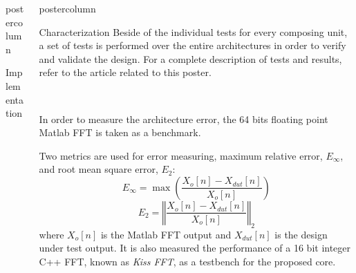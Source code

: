 \documentclass[final]{beamer}
\begin{document}
\begin{frame}{}
\begin{columns}
\begin{column}{.5\textwidth}
\begin{beamercolorbox}[center,wd=0.9\textwidth]{postercolumn}
\begin{minipage}[T]{.99\textwidth}
{\begin{block}{Implementation}
	    \end{block}

      }
      \end{minipage}
   \end{beamercolorbox}
\end{column}




\begin{column}{.5\textwidth}
   \begin{beamercolorbox}[center,wd=\textwidth]{postercolumn}
      \begin{minipage}[T]{.99\textwidth}
      \parbox[t][105cm]{\textwidth}{

		\begin{block}{Characterization}
		\justify
			Beside of the individual tests for every composing unit, a set of tests is performed over the entire architectures in order to verify and validate the design.
			For a complete description of tests and results, refer to the article related to this poster.\\
			~\\
			\begin{column}{.37\textwidth}
				In order to measure the architecture error, the 64 bits floating point Matlab FFT is taken as a benchmark.

				Two metrics are used for error measuring, maximum relative error, $E_\infty$, and root mean square error, $E_2$:
				\begin{equation}
				E_\infty = \max\left(\frac{ X_o[n] - X_{dut}[n]}{X_o[n]}\right)
				\label{eq:norma1}
				\end{equation}
				\begin{equation}
				E_2 = \left\Vert\frac{X_o[n] - X_{dut}[n]}{X_o[n]}\right\Vert_2
				\label{eq:norma2}
				\end{equation}
				where $X_o[n]$ is the Matlab FFT output and $X_{dut}[n]$ is the design under test output.
				It is also measured the performance of a 16 bit integer C++ FFT, known as \emph{Kiss FFT}, as a testbench for the proposed core.\\
			~\\
				

\end{column}
\end{block}}
\end{minipage}
\end{beamercolorbox}
\end{column}
\end{columns}
\end{frame}
\end{document}

